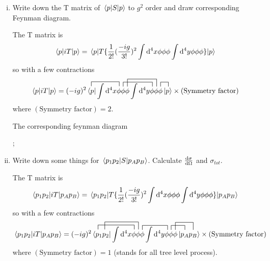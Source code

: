 \documentclass{article}
\begin{document}
\begin{enumerate}[(i)]
  \item Write down the T matrix of $\mel{p}{S}{p}$ to $g^2$ order and draw corresponding Feynman diagram.

  The T matrix is
  $$\mel{p}{iT}{p}=\mel{p}{T\{\frac{1}{2!}(\frac{-ig}{3!})^2\int\dd^4x\phi\phi\phi\int\dd^4y\phi\phi\phi\}}{p}$$
  so with a few contractions
  $$\mel{p}{iT}{p}=(-ig)^2\contraction[1.5ex]{}{\bra{p}}{\int\dd^4x}{\phi}\contraction[1.5ex]{\bra{p}\int\dd^4x\phi}{\phi}{\phi\int\dd^4y}{\phi}\contraction[2.5ex]{\bra{p}\int\dd^4x\phi\phi}{\phi}{\int\dd^4y\phi}{\phi}\contraction[1.5ex]{\bra{p}\int\dd^4x\phi\phi\phi\int\dd^4y\phi\phi}{\phi}{}{\ket{p}}\bra{p}\int\dd^4x\phi\phi\phi\int\dd^4y\phi\phi\phi\ket{p}\times (\text{Symmetry factor})$$
  where $(\text{Symmetry factor})=2$.

  The corresponding feynman diagram
  \begin{center}
    ;
  \end{center}

  \item Write down some things for $\mel{p_1p_2}{S}{p_Ap_B}$. Calculate $\dv{\sigma}{\Omega}$ and $\sigma_{tot}$.

  The T matrix is
  $$\mel{p_1p_2}{iT}{p_Ap_B}=\mel{p_1p_2}{T\{\frac{1}{2!}(\frac{-ig}{3!})^2\int\dd^4x\phi\phi\phi\int\dd^4y\phi\phi\phi\}}{p_Ap_B}$$
  so with a few contractions
  $$\mel{p_1p_2}{iT}{p_Ap_B}=(-ig)^2\contraction[1.5ex]{}{\bra{p_1}}{p_2\int\dd^4x}{\phi}\contraction[2.5ex]{p_1}{\bra{p_2}}{\int\dd^4x\phi}{\phi}\contraction[1.5ex]{\bra{p_1p_2}\int\dd^4x\phi\phi}{\phi}{\int\dd^4x}{\phi}\contraction[1.5ex]{\bra{p_1p_2}\int\dd^4x\phi\phi\phi\int\dd^4y\phi}{\phi}{\phi}{\bra{p_A}}\contraction[2.5ex]{\bra{p_1p_2}\int\dd^4x\phi\phi\phi\int\dd^4y\phi\phi}{\phi}{p_A}{\bra{p_B}} \bra{p_1p_2}\int\dd^4x\phi\phi\phi\int\dd^4y\phi\phi\phi\ket{p_Ap_B}
  \times (\text{Symmetry factor})$$
  where $(\text{Symmetry factor})=1$ (stands for all tree level process).


\end{enumerate}
\end{document}

